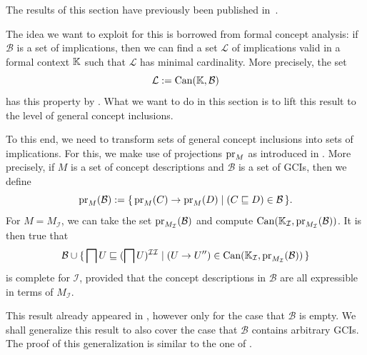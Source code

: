 The results of this section have previously been published
in~\cite{Borchmann:confident-GCIs}.

The idea we want to exploit for this is borrowed from formal concept analysis: if
$\mathcal{B}$ is a set of implications, then we can find a set $\mathcal{L}$ of
implications valid in a formal context ${\mathbb{K}}$ such that $\mathcal{L}$ has minimal
cardinality.  More precisely, the set
\begin{equation*}
  \mathcal{L} := \operatorname{Can}({\mathbb{K}}, \mathcal{B})
\end{equation*}
has this property by .  What
we want to do in this section is to lift this result to the level of general concept
inclusions.

To this end, we need to transform sets of general concept inclusions into sets of
implications.  For this, we make use of projections $\operatorname{pr}_M$ as introduced in
.  More precisely, if $M$ is a set of concept descriptions and
$\mathcal{B}$ is a set of GCIs, then we define
\begin{equation*}
  \operatorname{pr}_M(\mathcal{B}) := {\{\, \operatorname{pr}_M(C) \to \operatorname{pr}_M(D) \mid (C \sqsubseteq D) \in \mathcal{B} \,\}}.
\end{equation*}
For $M = M_{\mathcal{I}}$, we can take the set $\operatorname{pr}_{M_{\mathcal{I}}}(\mathcal{B})$ and
compute $\operatorname{Can}({\mathbb{K}}_{\mathcal{I}}, \operatorname{pr}_{M_{\mathcal{I}}}(\mathcal{B}))$.  It is then true
that
\begin{equation*}
  \mathcal{B} \cup {\ensuremath{\{\, \bigsqcap U \sqsubseteq (\bigsqcap U)^{\mathcal{I}\mathcal{I}} \mid (U \to U'')
    \in \operatorname{Can}({\mathbb{K}}_{\mathcal{I}}, \operatorname{pr}_{M_{\mathcal{I}}}(\mathcal{B})) \,\}}}
\end{equation*}
is complete for $\mathcal{I}$, provided that the concept descriptions in $\mathcal{B}$ are
all expressible in terms of $M_{\mathcal{I}}$.

This result already appeared in \cite[Theorem~5.12]{Diss-Felix}, however only for the case
that $\mathcal{B}$ is empty.  We shall generalize this result to also cover the case that
$\mathcal{B}$ contains arbitrary GCIs.  The proof of this generalization is similar to the
one of \cite[Theorem~5.12]{Diss-Felix}.

